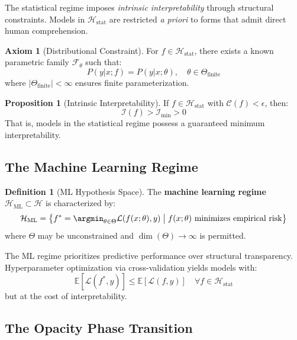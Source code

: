 \documentclass[11pt,a4paper]{article}
\theoremstyle{definition}
\newtheorem{definition}{Definition}[section]
\newtheorem{proposition}{Proposition}[section]
\newtheorem{axiom}{Axiom}[section]
\newcommand{\E}{\mathbb{E}}
\newcommand{\Hstat}{\mathcal{H}_{\text{stat}}}
\newcommand{\Hml}{\mathcal{H}_{\text{ML}}}
\newcommand{\Interp}{\mathcal{I}}
\newcommand{\Complex}{\mathcal{C}}
\begin{document}
The statistical regime imposes \textit{intrinsic interpretability} through structural constraints. Models in $\Hstat$ are restricted \textit{a priori} to forms that admit direct human comprehension.

\begin{axiom}[Distributional Constraint]
For $f \in \Hstat$, there exists a known parametric family $\mathcal{F}_\theta$ such that:
\begin{equation}
P(y|x; f) = P(y|x; \theta), \quad \theta \in \Theta_{\text{finite}}
\end{equation}
where $|\Theta_{\text{finite}}| < \infty$ ensures finite parameterization.
\end{axiom}

\begin{proposition}[Intrinsic Interpretability]
If $f \in \Hstat$ with $\Complex(f) < \epsilon$, then:
\begin{equation}
\Interp(f) > \Interp_{\min} > 0
\end{equation}
That is, models in the statistical regime possess a guaranteed minimum interpretability.
\end{proposition}

\subsection{The Machine Learning Regime}

\begin{definition}[ML Hypothesis Space]
The \textbf{machine learning regime} $\Hml \subset \mathcal{H}$ is characterized by:
\begin{equation}
\Hml = \left\{ f^* = \argmin_{\theta \in \Theta} \mathcal{L}(f(x; \theta), y) \;\middle|\;
f(x; \theta) \text{ minimizes empirical risk}
\right\}
\end{equation}
where $\Theta$ may be unconstrained and $\dim(\Theta) \to \infty$ is permitted.
\end{definition}

The ML regime prioritizes predictive performance over structural transparency. Hyperparameter optimization via cross-validation yields models with:
\begin{equation}
\E[\mathcal{L}(f^*, y)] \leq \E[\mathcal{L}(f, y)] \quad \forall f \in \Hstat
\end{equation}
but at the cost of interpretability.

\subsection{The Opacity Phase Transition}
\end{document}

